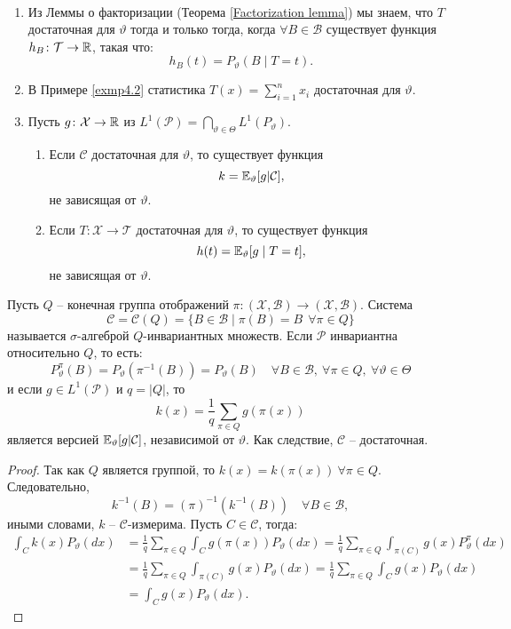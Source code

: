\begin{rmrk} \
	\begin{enumerate}
		\item Из Леммы о факторизации (Теорема \ref{Factorization lemma}) мы знаем, что $T$ достаточная для $\vartheta$ тогда и только тогда, когда $\forall B \in \mathcal{B}$ существует функция $h_B\colon\mathcal{T} \rightarrow \mathbb{R}$, такая что:
		\[ h_B(t)=P_\vartheta(B \mid T=t). \]
		\item В Примере \ref{exmp4.2} статистика $T(x)=\sum_{i=1}^{n}x_i$ достаточная для $\vartheta$.
		\item Пусть $g\colon\mathcal{X} \rightarrow \mathbb{R}$ из $L^1(\mathcal{P}) = \bigcap_{\vartheta \in \Theta}L^1(P_\vartheta)$.
		\begin{enumerate}
			\item Если $\mathcal{C}$ достаточная для $\vartheta$, то существует функция
			\[ k = \mathbb{E}_\vartheta[g | \mathcal{C}], \]
			не зависящая от $\vartheta$.
			\item Если $T\colon \mathcal{X} \rightarrow \mathcal{T}$ достаточная для $\vartheta$, то существует функция
			\[h(t)=\mathbb{E}_\vartheta[g \mid T=t],\]
			не зависящая от $\vartheta$.
		\end{enumerate}
	\end{enumerate}
\end{rmrk}

\begin{exmp}
	Пусть $Q$ -- конечная группа отображений $\pi\colon (\mathcal{X}, \mathcal{B}) \rightarrow (\mathcal{X}, \mathcal{B})$. Система
	\[ \mathcal{C}=\mathcal{C}(Q)=\{ B \in \mathcal{B} \mid \pi(B)=B \ \ \forall \pi \in Q \} \]
	называется $\sigma$-алгеброй $Q$-инвариантных множеств. Если $\mathcal{P}$ инвариантна относительно $Q$, то есть:
	\[P_\vartheta^\pi(B)=P_\vartheta(\pi^{-1}(B))=P_\vartheta(B) \quad \forall B \in \mathcal{B},\ \forall \pi \in Q,\ \forall \vartheta \in \Theta\]
	и если $g \in L^1(\mathcal{P})$ и $q=|Q|$, то
	\[ k(x)=\frac{1}{q} \sum_{\pi \in Q} g(\pi(x)) \]
	является версией $\mathbb{E}_\vartheta[g|\mathcal{C}]$, независимой от $\vartheta$. Как следствие, $\mathcal{C}$ -- достаточная.
\end{exmp}
\begin{proof}
	Так как $Q$ является группой, то $k(x)=k(\pi(x)) \ \forall \pi \in Q$. Следовательно, 
	\[ k^{-1}(B)=(\pi)^{-1}(k^{-1}(B)) \quad \forall B \in \mathcal{B}, \]
	иными словами, $k$ -- $\mathcal{C}$-измерима. Пусть $C \in \mathcal{C}$, тогда:
	\[
	\begin{aligned}
	    \int_{C} k(x)P_\vartheta(dx) & =\frac{1}{q}\sum_{\pi \in Q} \int_{C} g(\pi(x)) P_\vartheta(dx)=\frac{1}{q}\sum_{\pi \in Q} \int_{\pi(C)} g(x) P_\vartheta^\pi(dx) \\
	    & = \frac{1}{q}\sum_{\pi \in Q} \int_{\pi(C)} g(x) P_\vartheta(dx) = \frac{1}{q}\sum_{\pi \in Q} \int_{C} g(x) P_\vartheta(dx)\\
	    & = \int_{C} g(x)P_\vartheta(dx).
	\end{aligned}
	 \]
\end{proof}

